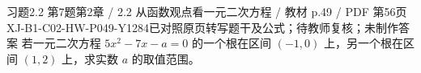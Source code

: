 \par\noindent\begin{minipage}{\linewidth}
\begin{bankitem}{习题2.2 第7题}{第2章 / 2.2 从函数观点看一元二次方程 / 教材 p.49 / PDF 第56页}{XJ-B1-C02-HW-P049-Y1284}{已对照原页转写题干及公式；待教师复核；未制作答案}
若一元二次方程 $5x^2-7x-a=0$ 的一个根在区间 $(-1,0)$ 上，另一个根在区间 $(1,2)$ 上，求实数 $a$ 的取值范围。
\end{bankitem}
\end{minipage}\par\medskip
